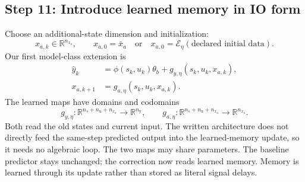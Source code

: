 \documentclass[11pt,a4paper]{article}
\newcommand{\R}{\mathbb R}
\begin{document}
\subsection*{Step 11: Introduce learned memory in IO form}
Choose an additional-state dimension and initialization:
\begin{equation}\label{eq:initiallatent}
x_{a,k}\in\R^{n_{x_a}},\qquad x_{a,0}=\bar x_a
\quad\text{or}\quad x_{a,0}=\mathcal E_\eta(\text{declared initial data}).
\end{equation}
Our first model-class extension is
\begin{equation}\label{eq:extendedIO}
\boxed{\begin{aligned}
\hat y_k&=\phi(s_k,u_k)\theta_b+g_{y,\eta}(s_k,u_k,x_{a,k}),\\
x_{a,k+1}&=g_{a,\eta}(s_k,u_k,x_{a,k}).
\end{aligned}}
\end{equation}
The learned maps have domains and codomains
\begin{equation}\label{eq:mapdimensions}
g_{y,\eta}:\R^{n_s+n_{\mathrm u}+n_{x_a}}\to\R^{n_{\mathrm y}},\qquad
g_{a,\eta}:\R^{n_s+n_{\mathrm u}+n_{x_a}}\to\R^{n_{x_a}}.
\end{equation}
Both read the old states and current input. The written architecture does not directly feed the same-step predicted output into the learned-memory update, so it needs no algebraic loop. The two maps may share parameters. The baseline predictor stays unchanged; the correction now reads learned memory. Memory is learned through its update rather than stored as literal signal delays.
\end{document}
